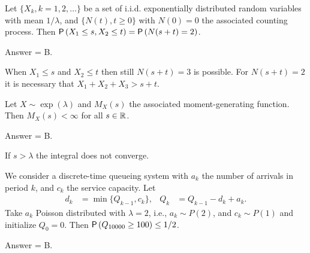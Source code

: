 \begin{exercise}[201903]
Let $\{X_k, k=1, 2, \ldots\}$ be a set of i.i.d. exponentially distributed random variables with mean $1/\lambda$, and $\{N(t), t\geq 0\}$ with $N(0)=0$ the associated counting process. Then $\P{X_1\leq s, X_2 \leq t} = \P{N(s+t) = 2}$. 
\begin{solution}
 Answer = B.

 When $X_1\leq s$ and $X_2\leq t$ then still $N(s+t)=3$ is possible. For $N(s+t)=2$ it is necessary that $X_1+X_2 + X_3 > s+t$. 
\end{solution}
\end{exercise}

\begin{exercise}[201903]
Let $X\sim\exp(\lambda)$ and $M_X(s)$ the associated moment-generating function. Then $M_X(s)<\infty$ for all $s\in \mathbb{R}$. 
\begin{solution}
 Answer = B.

 If $s>\lambda$ the integral does not converge. 
\end{solution}
\end{exercise}

\begin{exercise}[201903]
We consider a discrete-time queueing system with $a_k$ the number of arrivals in period $k$, and $c_k$ the service capacity. Let
\begin{align}
d_k &= \min\{Q_{k-1}, c_k\}, & Q_k &= Q_{k-1} -d_k + a_k.
\end{align}
Take $a_k$ Poisson distributed with $\lambda=2$, i.e., $a_k \sim P(2)$, and $c_k\sim P(1)$ and initialize $Q_0 = 0$. Then $\P{Q_{10000} \geq 100} \leq 1/2$. 
\begin{solution}
Answer = B.
\end{solution}
\end{exercise}

